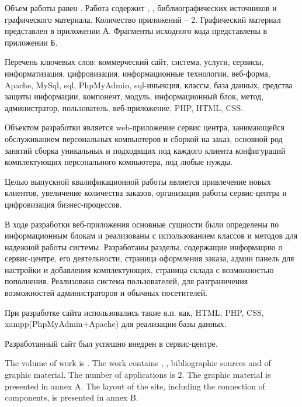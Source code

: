 
Объем работы равен . Работа содержит , ,  библиографических источников и  графического материала. Количество приложений – 2. Графический материал представлен в приложении А. Фрагменты исходного кода представлены в приложении Б.

Перечень ключевых слов: коммерческий сайт, система, услуги, сервисы, информатизация, цифровизация, информационные технологии, веб-форма,  Apache, MySql, sql, PhpMyAdmin, sql-иньекция, классы, база данных, средства защиты информации, компонент, модуль, информационный блок, метод,  администратор, пользователь, веб-приложение, PHP, HTML, CSS.

Объектом разработки является web-приложение сервис центра,  занимающейся обслуживанием персональных компьютеров и сборкой на заказ, основной род занятий сборка уникальных и подходящих под каждого клиента конфигураций комплектующих персонального компьютера, под любые нужды.

Целью выпускной квалификационной работы является привлечение новых клиентов, увеличение количества заказов, организация работы сервис-центра и цифровизация бизнес-процессов.

В ходе разработки веб-приложения основные сущности были определены по информационным блокам и реализованы с использованием классов и методов для надежной работы системы. Разработаны разделы, содержащие информацию о сервис-центре, его деятельности, страница оформления заказа, админ панель для настройки и добавления комплектующих, страница склада с возможностью пополнения. Реализована система пользователей, для разграничения возможностей администраторов и обычных посетителей.

При разработке сайта использовались такие я.п. как, HTML, PHP, CSS, xampp(PhpMyAdmin+Apache) для реализации базы данных.

Разработанный сайт был успешно внедрен в сервис-центре.

  
The volume of work is . The work contains , ,  bibliographic sources and  of graphic material. The number of applications is 2. The graphic material is presented in annex A. The layout of the site, including the connection of components, is presented in annex B.

